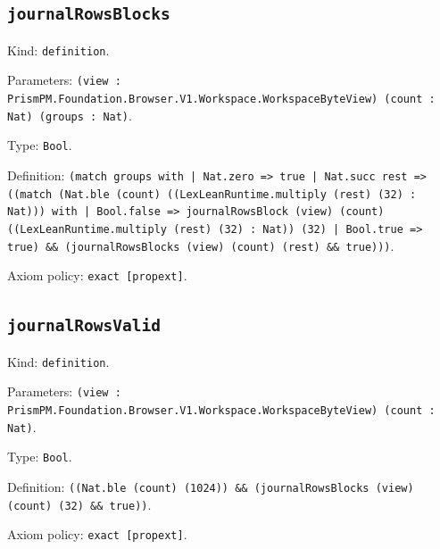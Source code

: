 \documentclass[11pt]{article}
\begin{document}
\subsection*{\texttt{journalRowsBlocks}}
\noindent Kind: \texttt{definition}.\par
\noindent Parameters: \texttt{(view : PrismPM.Foundation.Browser.V1.Workspace.WorkspaceByteView) (count : Nat) (groups : Nat)}.\par
\noindent Type: \texttt{Bool}.\par
\noindent Definition: \texttt{(match groups with | Nat.zero => true | Nat.succ rest => ((match (Nat.ble (count) ((LexLeanRuntime.multiply (rest) (32) : Nat))) with | Bool.false => journalRowsBlock (view) (count) ((LexLeanRuntime.multiply (rest) (32) : Nat)) (32) | Bool.true => true) \&\& (journalRowsBlocks (view) (count) (rest) \&\& true)))}.\par
\noindent Axiom policy: \texttt{exact [propext]}.\par
\subsection*{\texttt{journalRowsValid}}
\noindent Kind: \texttt{definition}.\par
\noindent Parameters: \texttt{(view : PrismPM.Foundation.Browser.V1.Workspace.WorkspaceByteView) (count : Nat)}.\par
\noindent Type: \texttt{Bool}.\par
\noindent Definition: \texttt{((Nat.ble (count) (1024)) \&\& (journalRowsBlocks (view) (count) (32) \&\& true))}.\par
\noindent Axiom policy: \texttt{exact [propext]}.\par
\end{document}
